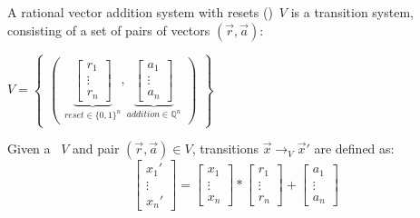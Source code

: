 \begin{frame}[t]
	\frametitle{\qvasr}
	\begin{definition}
		A rational vector addition system with resets (\qvasr)\ $V$ is a transition system, consisting of a set of pairs of vectors $(\vec{r}, \vec{a})$:\\
		\begin{center}
			$ V = 
			\begin{Bmatrix}
				\begin{pmatrix}
					\underbrace{
						\begin{bmatrix}
							r_1 \\
							\vdots \\
							r_n
					\end{bmatrix}}_{reset \in \{0,1\}^n},
					\underbrace{
						\begin{bmatrix}
							a_1 \\
							\vdots \\
							a_n
					\end{bmatrix}}_{addition \in \mathbb{Q}^n}
				\end{pmatrix}
			\end{Bmatrix}
			$
		\end{center}
	\end{definition}
	\onslide<+->
	\begin{definition}
		Given a \qvasr\ $V$ and pair $(\vec{r}, \vec{a}) \in V$, transitions $\vec{x} \rightarrow_V \vec{x}'$ are defined as: \\
		\begin{equation*}
			\begin{bmatrix}
				x_1' \\
				\vdots \\
				x_n'
			\end{bmatrix}
			=
			\begin{bmatrix}
				x_1 \\
				\vdots \\
				x_n
			\end{bmatrix}
			*
			\begin{bmatrix}
				r_1 \\
				\vdots \\
				r_n
			\end{bmatrix}
			+
			\begin{bmatrix}
				a_1 \\
				\vdots \\
				a_n
			\end{bmatrix}		
		\end{equation*}
	\end{definition}
\end{frame}